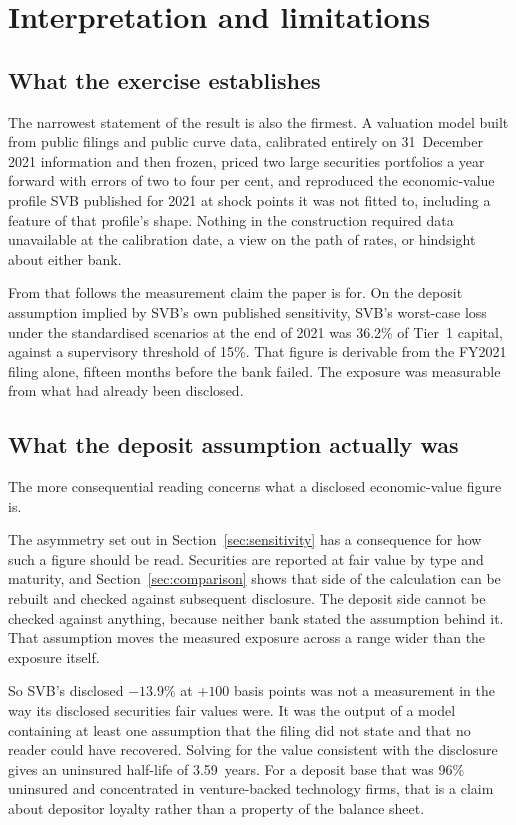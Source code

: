\section{Interpretation and limitations}
\label{sec:interpretation}

\subsection{What the exercise establishes}

The narrowest statement of the result is also the firmest. A valuation model built
from public filings and public curve data, calibrated entirely on 31~December 2021
information and then frozen, priced two large securities portfolios a year forward
with errors of two to four per cent, and reproduced the economic-value profile SVB
published for 2021 at shock points it was not fitted to, including a feature of that
profile's shape. Nothing in the construction required data unavailable at the
calibration date, a view on the path of rates, or hindsight about either bank.

From that follows the measurement claim the paper is for. On the deposit assumption
implied by SVB's own published sensitivity, SVB's worst-case loss under the
standardised scenarios at the end of 2021 was 36.2\% of Tier~1 capital, against a
supervisory threshold of 15\%. That figure is derivable from the FY2021 filing
alone, fifteen months before the bank failed. The exposure was measurable from what
had already been disclosed.

\subsection{What the deposit assumption actually was}

The more consequential reading concerns what a disclosed economic-value figure is.

The asymmetry set out in Section~\ref{sec:sensitivity} has a consequence for how such
a figure should be read. Securities are reported at fair value by type and maturity,
and Section~\ref{sec:comparison} shows that side of the calculation can be rebuilt
and checked against subsequent disclosure. The deposit side cannot be checked against
anything, because neither bank stated the assumption behind it. That
assumption moves the measured exposure across a range wider than the exposure itself.

So SVB's disclosed $-13.9\%$ at $+100$ basis points was not a measurement in the way
its disclosed securities fair values were. It was the output of a model containing at
least one assumption that the filing did not state and that no reader could have
recovered. Solving for the value consistent with the disclosure gives an uninsured
half-life of 3.59~years. For a deposit base that was 96\% uninsured and concentrated
in venture-backed technology firms, that is a claim about depositor loyalty rather
than a property of the balance sheet.

